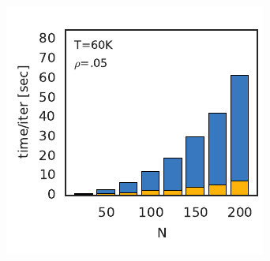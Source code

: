 \begin{figure}[t!]
\begin{subfigure}[b]{2.17in}
    \includegraphics[width=\textwidth]{figures/ch5/runtime_vs_N.pdf}
    \label{fig:runtime_vs_N}
  \end{subfigure}
  ~
  \begin{subfigure}[b]{1.27in}
    \centering
    \caption{}
    \vspace{-.25in}

\end{subfigure}
\end{figure}
